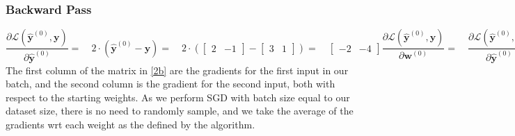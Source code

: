 \documentclass[addpoints]{exam}
\begin{document}
\subsubsection{Backward Pass}
\begin{subequations}
    \begin{equation}
    	\frac{\partial\mathscr{L}(\hat{\textbf{y}}^{(0)},\textbf{y})}{\partial \hat{\textbf{y}}^{(0)}} = \quad 2 \cdot (\hat{\textbf{y}}^{(0)} - \textbf{y}) = \quad 2 \cdot ( \begin{bmatrix}
    		2&-1 
    	\end{bmatrix} - \begin{bmatrix}
    		3&1 
    	\end{bmatrix}) =\quad \begin{bmatrix}
    		-2&-4
    	\end{bmatrix}
    \end{equation}
\begin{equation} \label{2b}
	\frac{\partial\mathscr{L}(\hat{\textbf{y}}^{(0)},\textbf{y})}{\partial \textbf{w}^{(0)}} =\quad \frac{\partial\mathscr{L}(\hat{\textbf{y}}^{(0)},\textbf{y})}{\partial \hat{\textbf{y}}^{(0)}}\cdot \frac{\partial\hat{\textbf{y}}^{(0)}}{\partial \textbf{w}^{(0)}}
	 =  \quad   2 \cdot (\hat{\textbf{y}}^{(0)} - \textbf{y}) \cdot \textbf{X}= \quad \begin{bmatrix}
		\begin{bmatrix}
			-2
		\end{bmatrix} & \begin{bmatrix}
			-4
		\end{bmatrix}
	\end{bmatrix} \cdot \begin{bmatrix}
	\begin{bmatrix}
		2 \\-1
		
	\end{bmatrix} \begin{bmatrix}
		-1 \\3
		
	\end{bmatrix}
\end{bmatrix}=  \quad \begin{bmatrix}
\begin{bmatrix}
	-4 \\2
	
\end{bmatrix}^{T} & \begin{bmatrix}
	4\\-12
	
\end{bmatrix}^{T} \end{bmatrix}
\end{equation}
    	\end{subequations}
    The first column of the matrix in \ref{2b} are the gradients for the first input in our batch, and the second column is the gradient for the second input, both with respect to the starting weights. As we perform SGD with batch size equal to our dataset size, there is no need to randomly sample, and  we take the average of the gradients wrt each weight as the defined by the algorithm.
\end{document}
